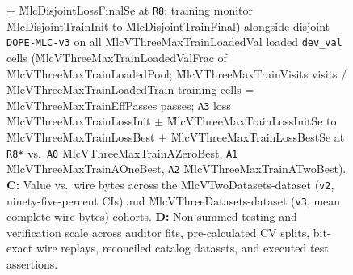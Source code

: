\begin{figure}[t]
{  $\pm$ \G{MlcDisjointLossFinalSe} at \texttt{R8}; training monitor \G{MlcDisjointTrainInit} to
  \G{MlcDisjointTrainFinal}) alongside disjoint \texttt{DOPE-MLC-v3} on all
  \G{MlcVThreeMaxTrainLoadedVal} loaded \texttt{dev\_val} cells (\G{MlcVThreeMaxTrainLoadedValFrac} of
  \G{MlcVThreeMaxTrainLoadedPool}; \G{MlcVThreeMaxTrainVisits} visits /
  \G{MlcVThreeMaxTrainLoadedTrain} training cells = \G{MlcVThreeMaxTrainEffPasses} passes; \texttt{A3}
  loss \G{MlcVThreeMaxTrainLossInit} $\pm$ \G{MlcVThreeMaxTrainLossInitSe} to
  \G{MlcVThreeMaxTrainLossBest} $\pm$ \G{MlcVThreeMaxTrainLossBestSe} at \texttt{R8*} vs.\ \texttt{A0}
  \G{MlcVThreeMaxTrainAZeroBest}, \texttt{A1} \G{MlcVThreeMaxTrainAOneBest}, \texttt{A2}
  \G{MlcVThreeMaxTrainATwoBest}). \textbf{C:} Value vs.\ wire bytes across the \G{MlcVTwoDatasets}-dataset
  (\texttt{v2}, ninety-five-percent CIs) and \G{MlcVThreeDatasets}-dataset (\texttt{v3}, mean complete wire bytes)
  cohorts. \textbf{D:} Non-summed testing and verification scale across auditor fits, pre-calculated CV
  splits, bit-exact wire replays, reconciled catalog datasets, and executed test assertions.}
  \label{fig:convergence}
\end{figure}

\begin{table}[t]
\centering
\caption{\textbf{Multi-level landmark and multi-task study summary} (\texttt{DOPE-MLC-v2} over
\G{MlcVTwoDatasets} datasets and \texttt{DOPE-MLC-v3} over \G{MlcVThreeDatasets} datasets and
\G{MlcVThreeCells} dataset--tier cells, plus pure-Rust \texttt{SafeTensors} parity for
\texttt{dope mlc-v3}; full receipts in \texttt{docs/multilevel-landmark-dl-study.md}).}
\label{tab:multilevel}
\small
{}
\end{table}

